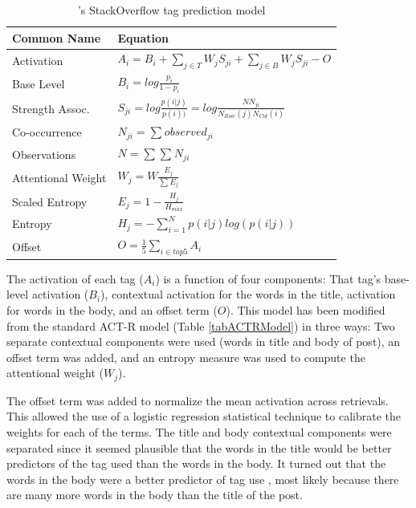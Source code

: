 \documentclass[man,floatsintext,donotrepeattitle]{apa6}
\begin{document}
\begin{table}[!ht]
  \caption{\citeauthor{Stanley2013}'s StackOverflow tag prediction model}
  \label{tabModACTRModel}
  {\tabulinesep=1.2mm
    \begin{tabu}{ll}
      \hline
      Common Name &  Equation \\
      \hline
      Activation & 		$A_{i} = B_{i} + \sum_{j\in T}^{ } W_{j} S_{ji} + \sum_{j\in B}^{ } W_{j} S_{ji} - O$ \\
      Base Level & 		$B_{i} = log \frac{p_{i}}{1-p_{i}}$ \\
      Strength Assoc. &		$S_{ji} = log \frac{p(i|j)}{p(i))} = log \frac{NN_{ji}}{N_{Row}(j)N_{Col}(i)}$ \\
      Co-occurrence &		$N_{ji} = \sum_{}^{}{observed_{ji}}$ \\
      Observations &		$N = \sum_{}^{}{\sum_{}^{}{N_{ji}}}$ \\
      Attentional Weight& 	$W_{j} = W \frac{E_{j}} {\sum_{}^{} {E_{j}}} $ \\
      Scaled Entropy & 		$E_{j} = 1-\frac{H_{j}}{H_{max}}$ \\
      Entropy & 		$H_{j} = -\sum_{i=1}^{N}p(i|j)log\left (  p(i|j) \right )$ \\
      Offset & 			$O = \frac{1}{5}\sum_{i\in top 5}^{ } A_{i}$ \\
      \hline
    \end{tabu}
  }
\end{table}

The activation of each tag ($A_{i}$) is a function of four components:
That tag's base-level activation ($B_{i}$), contextual activation for the words in the title, activation for words in the body, and an offset term ($O$).
This model has been modified from the standard ACT-R model (Table \ref{tabACTRModel}) in three ways:
Two separate contextual components were used (words in title and body of post), an offset term was added, and an entropy measure was used to compute the attentional weight ($W_{j}$).

The offset term was added to normalize the mean activation across retrievals.
This allowed the use of a logistic regression statistical technique to calibrate the weights for each of the terms.
The title and body contextual components were separated since it seemed plausible that the words in the title would be better predictors of the tag used than the words in the body.
It turned out that the words in the body were a better predictor of tag use \parencite{Stanley2013}, most likely because there are many more words in the body than the title of the post.
\end{document}

